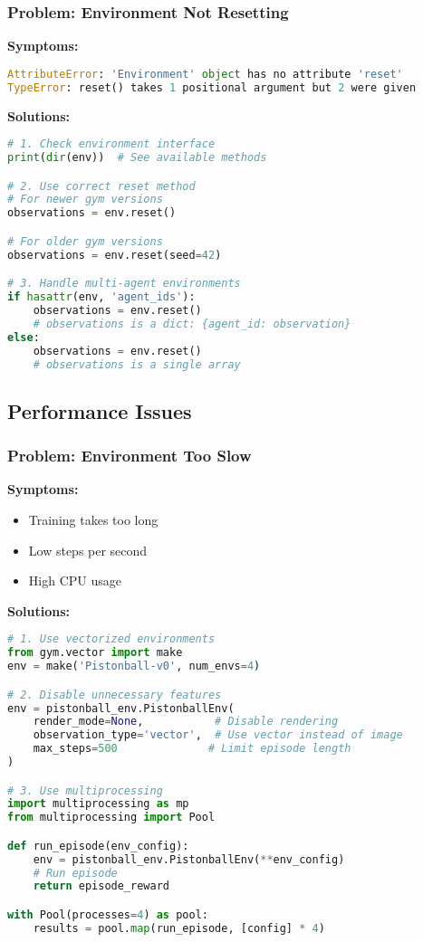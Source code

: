 \subsubsection{Problem: Environment Not Resetting}

\textbf{Symptoms:}
\begin{lstlisting}[language=python]
AttributeError: 'Environment' object has no attribute 'reset'
TypeError: reset() takes 1 positional argument but 2 were given
\end{lstlisting}

\textbf{Solutions:}

\begin{lstlisting}[language=python, caption=Fix Reset Issues]
# 1. Check environment interface
print(dir(env))  # See available methods

# 2. Use correct reset method
# For newer gym versions
observations = env.reset()

# For older gym versions
observations = env.reset(seed=42)

# 3. Handle multi-agent environments
if hasattr(env, 'agent_ids'):
    observations = env.reset()
    # observations is a dict: {agent_id: observation}
else:
    observations = env.reset()
    # observations is a single array
\end{lstlisting}

\subsection{Performance Issues}

\subsubsection{Problem: Environment Too Slow}

\textbf{Symptoms:}
\begin{itemize}
    \item Training takes too long
    \item Low steps per second
    \item High CPU usage
\end{itemize}

\textbf{Solutions:}

\begin{lstlisting}[language=python, caption=Optimize Performance]
# 1. Use vectorized environments
from gym.vector import make
env = make('Pistonball-v0', num_envs=4)

# 2. Disable unnecessary features
env = pistonball_env.PistonballEnv(
    render_mode=None,           # Disable rendering
    observation_type='vector',  # Use vector instead of image
    max_steps=500              # Limit episode length
)

# 3. Use multiprocessing
import multiprocessing as mp
from multiprocessing import Pool

def run_episode(env_config):
    env = pistonball_env.PistonballEnv(**env_config)
    # Run episode
    return episode_reward

with Pool(processes=4) as pool:
    results = pool.map(run_episode, [config] * 4)
\end{lstlisting}


